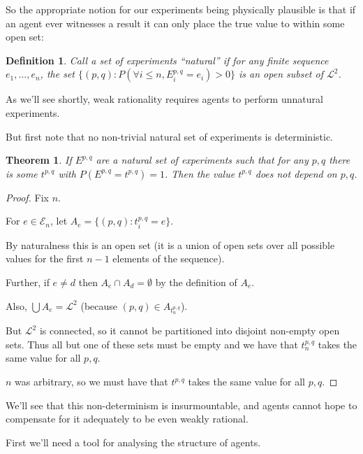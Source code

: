 \documentclass[a4paper]{book}
\newtheorem{definition}{Definition}
\newtheorem{theorem}{Theorem}
\begin{document}
So the appropriate notion for our experiments being physically plausible
is that if an agent ever witnesses a result it can only place the true
value to within some open set:

\begin{definition}
Call a set of experiments ``natural'' if for any finite sequence
$e_1, \ldots, e_n$,
the set $\{(p, q): P(\forall i \leq n, E^{p, q}_i = e_i) > 0\}$
is an open subset of $\mathcal{L}^2$.
\end{definition}

As we'll see shortly, weak rationality requires agents to perform
unnatural experiments.

But first note that no non-trivial natural set of experiments is
deterministic.

\begin{theorem}
If $E^{p, q}$
are a natural set of experiments such that for any $p, q$
there is some $t^{p, q}$
with $P(E^{p, q} = t^{p, q}) = 1$.
Then the value $t^{p, q}$
does not depend on $p, q$.
\end{theorem}

\begin{proof}

Fix $n$.

For $e \in \mathcal{E}_n$, let $A_e = \{(p, q): t^{p, q}_i = e\}$.

By naturalness this is an open set (it is a union of open sets over
all possible values for the first $n - 1$ elements of the sequence).

Further, if $e \neq d$ then $A_e \cap A_d = \emptyset$
by the definition of $A_e$.

Also, $\bigcup A_e = \mathcal{L}^2$
(because $(p, q) \in A_{t^{p, q}_n}$).

But $\mathcal{L}^2$
is connected, so it cannot be partitioned into disjoint non-empty
open sets. Thus all but one of these sets must be empty and we have
that $t^{p, q}_n$
takes the same value for all $p, q$.

$n$
was arbitrary, so we must have that $t^{p, q}$
takes the same value for all $p, q$.
\end{proof}

We'll see that this non-determinism is insurmountable, and agents cannot
hope to compensate for it adequately to be even weakly rational.

First we'll need a tool for analysing the structure of agents.
\end{document}
